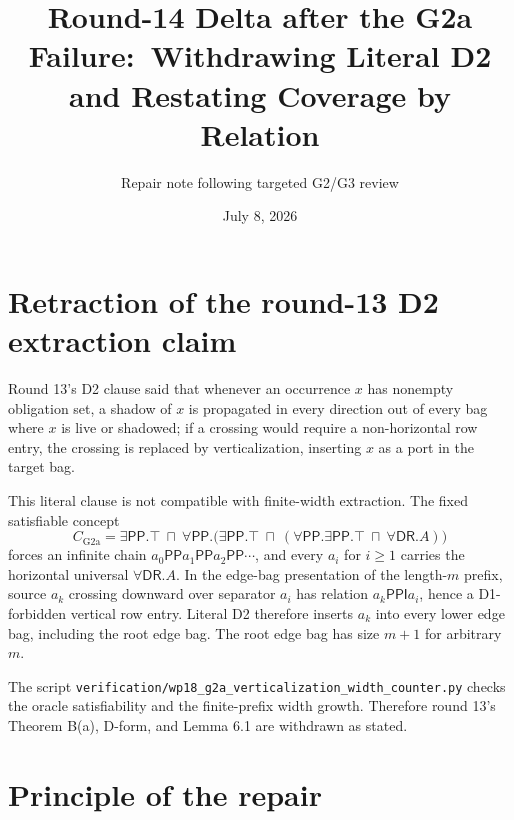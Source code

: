 \documentclass[11pt]{article}
\title{Round-14 Delta after the G2a Failure:\
Withdrawing Literal D2 and Restating Coverage by Relation}
\author{Repair note following targeted G2/G3 review}
\date{July 8, 2026}
\newcommand{\PP}{\mathsf{PP}}
\newcommand{\PPI}{\mathsf{PPI}}
\newcommand{\DR}{\mathsf{DR}}
\newcommand{\code}[1]{\texttt{#1}}
\begin{document}
\maketitle

\begin{center}
\end{center}

\section{Retraction of the round-13 D2 extraction claim}

Round 13's D2 clause said that whenever an occurrence $x$ has nonempty
obligation set, a shadow of $x$ is propagated in every direction out of every
bag where $x$ is live or shadowed; if a crossing would require a non-horizontal
row entry, the crossing is replaced by verticalization, inserting $x$ as a
port in the target bag.

This literal clause is not compatible with finite-width extraction.  The fixed
satisfiable concept
\[
C_{\mathrm{G2a}}=\exists\PP.\top\ \sqcap\
\forall\PP.\bigl(\exists\PP.\top\ \sqcap\
        (\forall\PP.\exists\PP.\top\ \sqcap\ \forall\DR.A)\bigr)
\]
forces an infinite chain $a_0\PP a_1\PP a_2\PP\cdots$, and every $a_i$ for
$i\ge 1$ carries the horizontal universal $\forall\DR.A$.  In the edge-bag
presentation of the length-$m$ prefix, source $a_k$ crossing downward over
separator $a_i$ has relation $a_k\PPI a_i$, hence a D1-forbidden vertical row
entry.  Literal D2 therefore inserts $a_k$ into every lower edge bag, including
the root edge bag.  The root edge bag has size $m+1$ for arbitrary $m$.

The script \code{verification/wp18\_g2a\_verticalization\_width\_counter.py}
checks the oracle satisfiability and the finite-prefix width growth.  Therefore
round 13's Theorem B(a), D-form, and Lemma 6.1 are withdrawn as stated.

\section{Principle of the repair}
\end{document}
